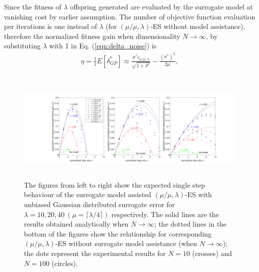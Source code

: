 

Since the fitness of $\lambda$ offspring generated are evaluated by the surrogate model at vanishing cost by earlier assumption. The number of objective function evaluation per iterations is one instead of $\lambda$ (for $(\mu/\mu,\lambda)$-ES without model assistance), therefore the normalized fitness gain when dimensionality $N \rightarrow \infty$, by substituting $\lambda$ with 1 in Eq. (\ref{eqn:delta_noise}) is 
\begin{align}\label{eqn:eta_surrogate}{}
\eta = \frac{1}{1}E[ \delta_{GP}^*] \approx  \frac{\sigma^* c_{\mu / \mu, \lambda}}{\sqrt {1+ \vartheta^2}} - \frac{(\sigma^*)^2}{2 \mu} ,
\end{align}

\begin{center}
\begin{figure}
\includegraphics[height=2.1in, width=6.0in]{expectedFitGain_final_2}
\caption{The figures from left to right show the expected single step behaviour of the surrogate model assisted $(\mu/\mu,\lambda)$-ES with unbiased Gaussian distributed surrogate error for $\lambda=10,20,40\ (\mu = \lceil \lambda/4 \rceil)$ respectively. The solid lines are the results obtained analytically when $N \rightarrow \infty$; the dotted lines in the bottom of the figures show the relationship for corresponding $(\mu/\mu,\lambda)$-ES without surrogate model assistance (when $N\rightarrow \infty$); the dots represent the experimental results for $N=10$ (crosses) and $N=100$ (circles). 
}
\label{fig:expectedFitGain}
\end{figure}
\end{center}

